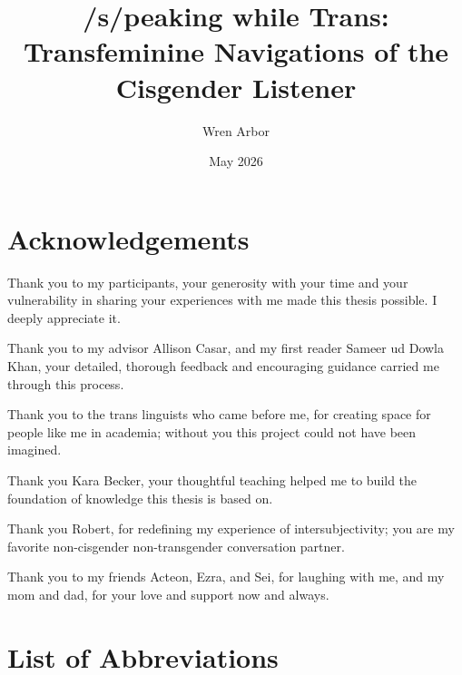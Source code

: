 \documentclass[12pt,twoside]{reedthesis}
\title{/s/peaking while Trans: Transfeminine Navigations of the Cisgender Listener}
\author{Wren Arbor}
\date{May 2026}
\begin{document}
  \maketitle
  \frontmatter %
  \pagestyle{empty} %

    \chapter*{Acknowledgements}
	Thank you to my participants, your generosity with your time and your vulnerability in sharing your experiences with me made this thesis possible. I deeply appreciate it.

	Thank you to my advisor Allison Casar, and my first reader Sameer ud Dowla Khan, your detailed, thorough feedback and encouraging guidance carried me through this process.

	Thank you to the trans linguists who came before me, for creating space for people like me in academia; without you this project could not have been imagined.

	Thank you Kara Becker, your thoughtful teaching helped me to build the foundation of knowledge this thesis is based on.

	Thank you Robert, for redefining my experience of intersubjectivity; you are my favorite non-cisgender non-transgender conversation partner.

	Thank you to my friends Acteon, Ezra, and Sei, for laughing with me, and my mom and dad, for your love and support now and always.




	
	

    \chapter*{List of Abbreviations}
\end{document}
